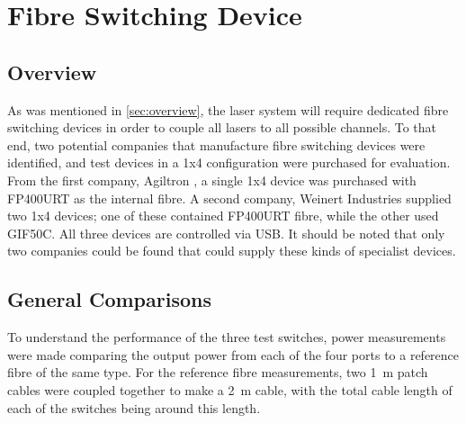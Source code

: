 \documentclass[a4paper,11pt]{article}
\begin{document}
\section{Fibre Switching Device}\label{sec:switch}

\subsection{Overview}
As was mentioned in \cref{sec:overview}, the laser system will require dedicated fibre switching devices in order to couple all lasers to all possible channels. To that end, two potential companies that manufacture fibre switching devices were identified, and test devices in a 1x4 configuration were purchased for evaluation. From the first company, Agiltron \cite{bib:agiltron}, a single 1x4 device was purchased with FP400URT as the internal fibre. A second company, Weinert Industries \cite{bib:weinert} supplied two 1x4 devices; one of these contained FP400URT fibre, while the other used GIF50C. All three devices are controlled via USB. It should be noted that only two companies could be found that could supply these kinds of specialist devices.

\subsection{General Comparisons}

To understand the performance of the three test switches, power measurements were made comparing the output power from each of the four ports to a reference fibre of the same type. For the reference fibre measurements, two 1~m patch cables were coupled together to make a 2~m cable, with the total cable length of each of the switches being around this length.
\end{document}
